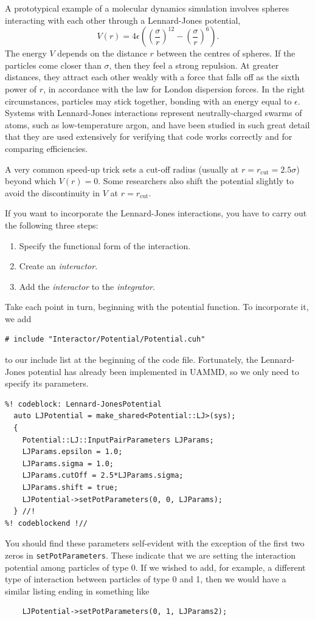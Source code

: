 A prototypical example of a molecular dynamics simulation involves spheres 
interacting with each other through a Lennard-Jones potential,
\begin{equation*}
  V(r) = 4\epsilon\left(\left(\frac{\sigma}{r}\right)^{12}
                        - \left(\frac{\sigma}{r}\right)^6\right). 
\end{equation*}
The energy $V$ depends on the distance $r$ between the centres of spheres. If 
the particles come closer than $\sigma$, then they feel a strong repulsion. At
greater distances, they attract each other weakly with a force that falls off
as the sixth power of $r$, in accordance with the law for London dispersion
forces. In the right circumstances, particles may stick together, bonding with
an energy equal to $\epsilon$. Systems with Lennard-Jones interactions represent
neutrally-charged swarms of atoms, such as low-temperature argon, and have been
studied in such great detail that they are used extensively for verifying that
code works correctly and for comparing efficiencies.

A very common speed-up trick sets a cut-off radius (usually at
$r = r_{\mathrm{cut}} = 2.5 \sigma$) beyond which $V(r) = 0$. Some researchers
also shift the potential slightly to avoid the discontinuity in $V$ at
$r = r_{\mathrm{cut}}$.

If you want to incorporate the Lennard-Jones interactions, you have to carry out 
the following three steps:
\begin{enumerate}
  \item Specify the functional form of the interaction.
  \item Create an \textit{interactor}.
  \item Add the \textit{interactor} to the \textit{integrator}.
\end{enumerate}

Take each point in turn, beginning with the potential function. To incorporate
it, we add
\begin{lstlisting}
# include "Interactor/Potential/Potential.cuh"
\end{lstlisting}
to our include list at the beginning of the code file. Fortunately, the
Lennard-Jones potential has already been implemented in UAMMD, so we
only need to specify its parameters.
\begin{lstlisting}
%! codeblock: Lennard-JonesPotential
  auto LJPotential = make_shared<Potential::LJ>(sys);
  {
    Potential::LJ::InputPairParameters LJParams;
    LJParams.epsilon = 1.0;
    LJParams.sigma = 1.0;
    LJParams.cutOff = 2.5*LJParams.sigma;
    LJParams.shift = true;
    LJPotential->setPotParameters(0, 0, LJParams);
  } //!
%! codeblockend !//
\end{lstlisting}
You should find these parameters self-evident with the exception of the first
two zeros in \texttt{setPotParameters}. These indicate that we are setting the
interaction potential among particles of type 0. If we wished to add, for
example, a different type of interaction between particles of type 0 and 1,
then we would have a similar listing ending in something like
\begin{lstlisting}
    LJPotential->setPotParameters(0, 1, LJParams2);
\end{lstlisting}

